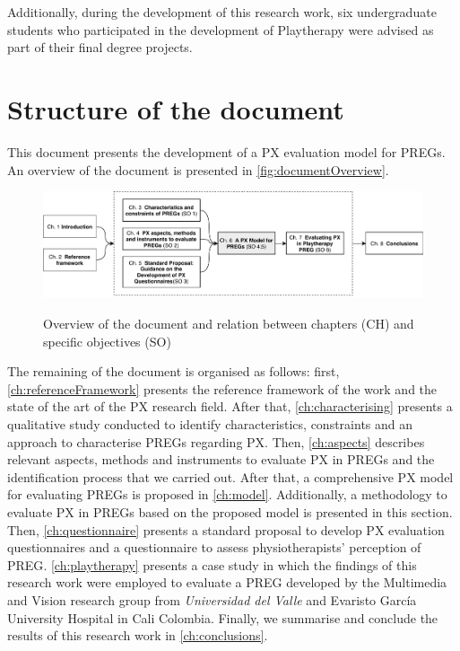 Additionally, during the development of this research work, six undergraduate students who participated in the development of Playtherapy were advised as part of their final degree projects.
\section{Structure of the document}

This document presents the development of a \ac{PX} evaluation model for \acp{PREG}. An overview of the document is presented in \autoref{fig:documentOverview}.

\begin{figure}[htb]
\myfloatalign
{\includegraphics[width=\linewidth]{gfx/intro/documentOverview}} \quad
\caption{Overview of the document and relation between chapters (CH) and specific objectives (SO)}\label{fig:documentOverview}
\end{figure}

The remaining of the document is organised as follows: first, \autoref{ch:referenceFramework} presents the reference framework of the work and the state of the art of the \ac{PX} research field. After that, \autoref{ch:characterising} presents a qualitative study conducted to identify characteristics, constraints and an approach to characterise \acp{PREG} regarding \ac{PX}. Then, \autoref{ch:aspects} describes relevant aspects, methods and instruments to evaluate \ac{PX} in \acp{PREG} and the identification process that we carried out. After that, a comprehensive \ac{PX} model for evaluating \acp{PREG} is proposed in \autoref{ch:model}. Additionally, a methodology to evaluate \ac{PX} in \acp{PREG} based on the proposed model is presented in this section. Then, \autoref{ch:questionnaire} presents a standard proposal to develop \ac{PX} evaluation questionnaires and a questionnaire to assess physiotherapists' perception of \ac{PREG}. \autoref{ch:playtherapy} presents a case study in which the findings of this research work were employed to evaluate a \ac{PREG} developed by the Multimedia and Vision research group from \textit{Universidad del Valle} and Evaristo Garc\'ia University Hospital in Cali Colombia. Finally, we summarise and conclude the results of this research work in \autoref{ch:conclusions}.